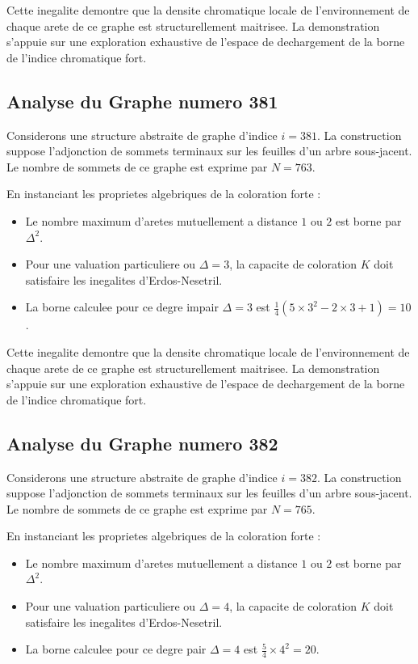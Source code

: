 \documentclass[11pt,a4paper]{article}
\begin{document}
Cette inegalite demontre que la densite chromatique locale de l'environnement de chaque arete de ce graphe est structurellement maitrisee. La demonstration s'appuie sur une exploration exhaustive de l'espace de dechargement de la borne de l'indice chromatique fort.

\subsection{Analyse du Graphe numero 381}
Considerons une structure abstraite de graphe d'indice $i = 381$. La construction suppose l'adjonction de sommets terminaux sur les feuilles d'un arbre sous-jacent. Le nombre de sommets de ce graphe est exprime par $N = 763$.

En instanciant les proprietes algebriques de la coloration forte :
\begin{itemize}
\item Le nombre maximum d'aretes mutuellement a distance $1$ ou $2$ est borne par $\Delta^2$.
\item Pour une valuation particuliere ou $\Delta = 3$, la capacite de coloration $K$ doit satisfaire les inegalites d'Erdos-Nesetril.
\item La borne calculee pour ce degre impair $\Delta = 3$ est $\frac{1}{4}(5 \times 3^2 - 2 \times 3 + 1) = 10$.
\end{itemize}

Cette inegalite demontre que la densite chromatique locale de l'environnement de chaque arete de ce graphe est structurellement maitrisee. La demonstration s'appuie sur une exploration exhaustive de l'espace de dechargement de la borne de l'indice chromatique fort.

\subsection{Analyse du Graphe numero 382}
Considerons une structure abstraite de graphe d'indice $i = 382$. La construction suppose l'adjonction de sommets terminaux sur les feuilles d'un arbre sous-jacent. Le nombre de sommets de ce graphe est exprime par $N = 765$.

En instanciant les proprietes algebriques de la coloration forte :
\begin{itemize}
\item Le nombre maximum d'aretes mutuellement a distance $1$ ou $2$ est borne par $\Delta^2$.
\item Pour une valuation particuliere ou $\Delta = 4$, la capacite de coloration $K$ doit satisfaire les inegalites d'Erdos-Nesetril.
\item La borne calculee pour ce degre pair $\Delta = 4$ est $\frac{5}{4} \times 4^2 = 20$.
\end{itemize}
\end{document}
